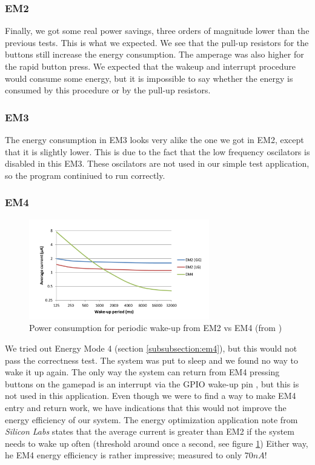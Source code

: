 		\subsubsection{EM2}
		Finally, we got some real power savings, three orders of magnitude lower than the previous tests. This is what we expected. We see that the pull-up resistors for the buttons still increase the energy consumption. The amperage was also higher for the rapid button press. We expected that the wakeup and interrupt procedure would consume some energy, but it is impossible to say whether the energy is consumed by this procedure or by the pull-up resistors.

		\subsubsection{EM3}
		The energy consumption in EM3 looks very alike the one we got in EM2, except that it is slightly lower. This is due to the fact that the low frequency oscilators is disabled in this EM3. These oscilators are not used in our simple test application, so the program continiued to run correctly.
		\subsubsection{EM4}
		\begin{figure}[t]
			\centerline{
				\includegraphics[width=0.7\textwidth]{img/em2vsem4.png}
			}
			\caption{Power consumption for periodic wake-up from EM2 vs EM4 (from \cite[p. 9]{energy_optimization_application_note})}
			\label{fig:em2vsem4}
			
		\end{figure}
		We tried out Energy Mode 4 (section \ref{subsubsection:em4}), but this would not pass the correctness test. The system was put to sleep and we found no way to wake it up again. The only way the system can return from EM4 pressing buttons on the gamepad is an interrupt via the GPIO wake-up pin \cite[p. 8]{reference_manual}, but this is not used in this application. Even though we were to find a way to make EM4 entry and return work, we have indications that this would not improve the energy efficiency of our system. The energy optimization application note from \emph{Silicon Labs} states that the average current is greater than EM2 if the system needs to wake up often (threshold around once a second, see figure \ref{fig:em2vsem4})  Either way, he EM4 energy efficiency is rather impressive; measured to only $70nA$!

